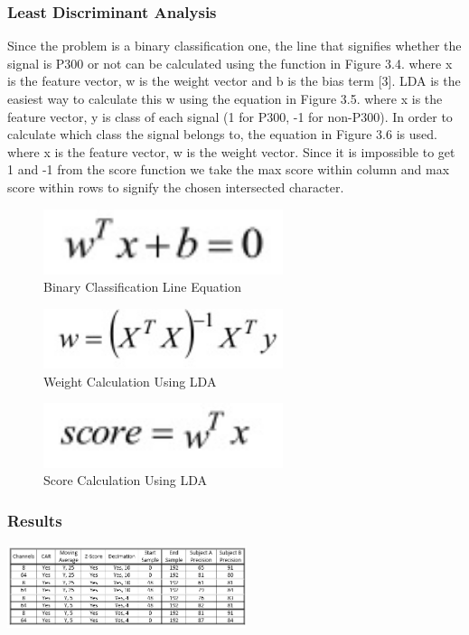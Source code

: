 \subsubsection{Least Discriminant Analysis}
Since the problem is a binary classification one, the line that signifies whether the signal is P300 or not can be calculated using the function in Figure 3.4.\newline
where x is the feature vector, w is the weight vector and b is the bias term [3]. \newline\newline
LDA is the easiest way to calculate this w using the equation in Figure 3.5.\newline
where x is the feature vector, y is class of each signal (1 for P300, -1 for non-P300).\newline\newline
In order to calculate which class the signal belongs to, the equation in Figure 3.6 is used.\newline
where x is the feature vector, w is the weight vector.\newline\newline
Since it is impossible to get 1 and -1 from the score function we take the max score within column and max score within rows to signify the chosen intersected character.
\begin{figure}
    \centering
    \includegraphics[width=70mm]{images/binary-classification-line-equation.jpg}
    \caption{Binary Classification Line Equation}
    \label{fig:my_label}
\end{figure}
\begin{figure}
    \centering
    \includegraphics[width=70mm]{images/weight-calculation-lda.jpg}
    \caption{Weight Calculation Using LDA}
    \label{fig:my_label}
\end{figure}
\begin{figure}
    \centering
    \includegraphics[width=70mm]{images/score-calculation-lda.jpg}
    \caption{Score Calculation Using LDA}
    \label{fig:my_label}
\end{figure}
\subsubsection{Results}
\includegraphics[width=70mm]{images/test-results.jpg}

